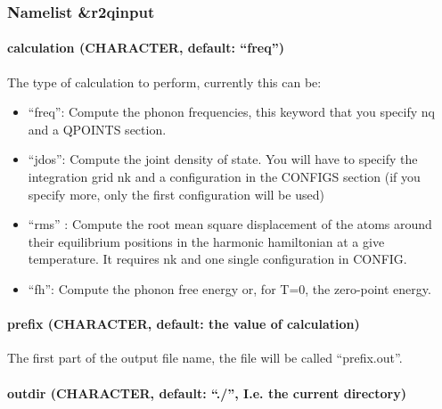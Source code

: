 \documentclass[
]{article}
\providecommand{\tightlist}{%
  \setlength{\itemsep}{0pt}\setlength{\parskip}{0pt}}
\begin{document}
\hypertarget{namelist-r2qinput}{%
\subsubsection{Namelist \&r2qinput}\label{namelist-r2qinput}}

\hypertarget{calculation-character-default-freq}{%
\paragraph{\texorpdfstring{calculation (CHARACTER, default:
\enquote{freq})}{calculation (CHARACTER, default: ``freq'')}}\label{calculation-character-default-freq}}

The type of calculation to perform, currently this can be:

\begin{itemize}
\tightlist
\item
  \enquote{freq}: Compute the phonon frequencies, this keyword that you
  specify nq and a QPOINTS section.
\item
  \enquote{jdos}: Compute the joint density of state. You will have to
  specify the integration grid nk and a configuration in the CONFIGS
  section (if you specify more, only the first configuration will be
  used)
\item
  \enquote{rms} : Compute the root mean square displacement of the atoms
  around their equilibrium positions in the harmonic hamiltonian at a
  give temperature. It requires nk and one single configuration in
  CONFIG.
\item
  \enquote{fh}: Compute the phonon free energy or, for T=0, the
  zero-point energy.
\end{itemize}

\hypertarget{prefix-character-default-the-value-of-calculation}{%
\paragraph{prefix (CHARACTER, default: the value of
calculation)}\label{prefix-character-default-the-value-of-calculation}}

The first part of the output file name, the file will be called
\enquote{prefix.out}.

\hypertarget{outdir-character-default-.-i.e.-the-current-directory}{%
\paragraph{\texorpdfstring{outdir (CHARACTER, default: \enquote{./},
I.e. the current
directory)}{outdir (CHARACTER, default: ``./'', I.e. the current directory)}}\label{outdir-character-default-.-i.e.-the-current-directory}}
\end{document}

